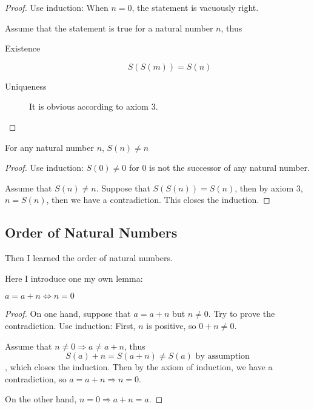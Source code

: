 \begin{proof}
Use induction: When $n=0$, the statement is vacuously right.

Assume that the statement is true for a natural number $n$, thus
\begin{description}
\item[Existence] 
\[
S(S(m)) = S(n)
\]
\item[Uniqueness]
It is obvious according to axiom 3.
\end{description}
\end{proof}

\begin{prop}
For any natural number $n$, $S(n) \neq n$
\end{prop}
\begin{proof}
Use induction: $S(0) \neq 0$ for 0 is not the successor of any natural number.

Assume that $S(n) \neq n$. Suppose that $S(S(n)) = S(n)$, then by axiom 3, $n=S(n)$, then we have a 
contradiction. This closes the induction. \qedhere
\end{proof}

\subsection{Order of Natural Numbers}
Then I learned the order of natural numbers.

Here I introduce one my own lemma:
\begin{lem}
$a=a+n \Longleftrightarrow n=0$  \label{lem3}
\end{lem}
\begin{proof}
On one hand, suppose that $a=a+n$ but $n \neq 0$. Try to prove the contradiction. Use induction:
First, $n$ is positive, so $0+n \neq 0$.

Assume that $n \neq 0 \Longrightarrow a \neq a+n$, thus 
\[
S(a)+n=S(a+n) \neq S(a) \text{ by assumption}
\], which closes the induction. Then by the axiom of induction, we have a contradiction, so 
$a=a+n \Longrightarrow n=0$.

On the other hand, $n=0 \Longrightarrow a+n=a$. \qedhere
\end{proof}

